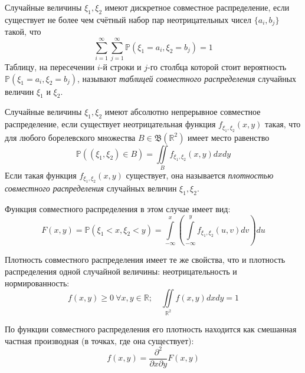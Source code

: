 \begin{defn}
    Случайные величины $\xi_1, \xi_2$ имеют дискретное совместное распределение, если существует не более чем счётный набор пар неотрицательных чисел $\{a_{i}, b_{j}\}$ такой, что
    \begin{equation*}
        \sum\limits_{i=1}^{\infty} \sum\limits_{j=1}^{\infty} \mathbb{P}\left(\xi_{1}=a_{i}, \xi_{2}=b_{j}\right)=1
    \end{equation*}
    Таблицу, на пересечении $i$-й строки и $j$-го столбца которой стоит вероятность $\mathbb{P}\left(\xi_{1}=a_{i}, \xi_{2}=b_{j}\right)$, называют {\it таблицей совместного распределения} случайных величин $\xi_1$ и $\xi_2$.
\end{defn}
\begin{defn}
    Случайные величины $\xi_1, \xi_2$ имеют абсолютно непрерывное совместное распределение, если существует неотрицательная функция $f_{\xi_{1}, \xi_{2}}(x, y)$ такая, что для любого борелевского множества $B \in \mathfrak{B}\left(\mathbb{R}^{2}\right)$ имеет место равенство
    \begin{equation*}
        \mathbb{P}\left(\left(\xi_{1}, \xi_{2}\right) \in B\right)=\iint\limits_{B} f_{\xi_{1}, \xi_{2}}(x, y) d x d y
    \end{equation*}
    Если такая функция $f_{\xi_{1}, \xi_{2}}(x, y)$ существует, она называется {\it плотностью совместного распределения} случайных величин $\xi_1, \xi_2$.
    
    Функция совместного распределения в этом случае имеет вид:
    \begin{equation*}
        F(x, y)=\mathbb{P}(\xi_{1}<x, \xi_{2}<y)=\int\limits_{-\infty}^{x}\left(\int\limits_{-\infty}^{y} f_{\xi_{1}, \xi_{2}}(u, v) d v\right) d u
    \end{equation*}
\end{defn}

\begin{rmrk}
    Плотность совместного распределения имеет те же свойства, что и плотность распределения одной случайной величины: неотрицательность и нормированность:
    \begin{equation*}
        f(x, y) \geqslant 0~ \forall x,y \in \mathbb{R}; \quad \iint\limits_{\mathbb{R}^{2}} f(x, y) dx dy = 1
    \end{equation*}

    По функции совместного распределения его плотность находится как смешанная частная производная (в точках, где она существует):
    \begin{equation*}
        f(x, y)=\frac{\partial^{2}}{\partial x \partial y} F(x, y)
    \end{equation*}
\end{rmrk}

